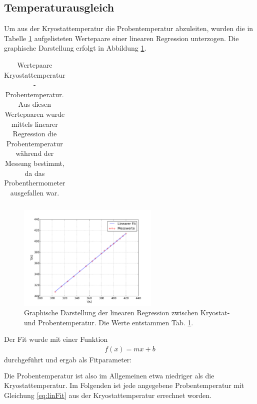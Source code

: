 \subsection{Temperaturausgleich}
Um aus der Kryostattemperatur die Probentemperatur abzuleiten, wurden die in Tabelle \ref{tab:cryoSample} aufgelisteten Wertepaare einer linearen Regression unterzogen. Die graphische Darstellung erfolgt in Abbildung \ref{fig:linFit}.
\begin{table}[htbp]
	\begin{tabular}{c|c}
		
	\end{tabular}
	\caption{Wertepaare Kryostattemperatur - Probentemperatur. Aus diesen Wertepaaren wurde mittels linearer Regression die Probentemperatur während der Messung bestimmt, da das Probenthermometer ausgefallen war.}
	\label{tab:cryoSample}
\end{table}
\begin{figure}[htbp]
	\includegraphics[width=0.6\textwidth]{../auswertung/cryoSampleFit/01_regressionTemp.pdf}
	\caption{Graphische Darstellung der linearen Regression zwischen Kryostat- und Probentemperatur. Die Werte entstammen Tab. \ref{tab:cryoSample}.}
	\label{fig:linFit}
\end{figure}

Der Fit wurde mit einer Funktion 
\begin{align}
	f(x) = mx+b
	\label{eq:linFit}
\end{align}
durchgeführt und ergab als Fitparameter:
\begin{align*}
	\\
	
\end{align*}
Die Probentemperatur ist also im Allgemeinen etwa niedriger als die Kryostattemperatur. Im Folgenden ist jede angegebene Probentemperatur mit Gleichung \ref{eq:linFit} aus der Kryostattemperatur errechnet worden. 
